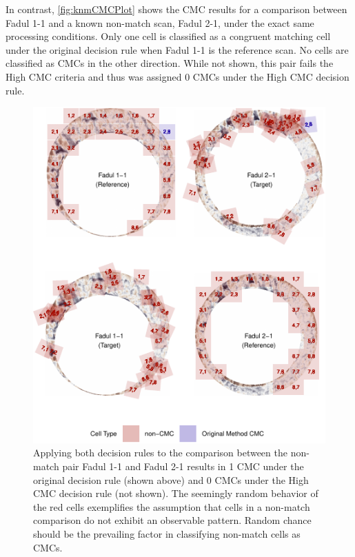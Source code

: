In contrast, \autoref{fig:knmCMCPlot} shows the CMC results for a
comparison between Fadul 1-1 and a known non-match scan, Fadul 2-1,
under the exact same processing conditions. Only one cell is classified
as a congruent matching cell under the original decision rule when Fadul
1-1 is the reference scan. No cells are classified as CMCs in the other
direction. While not shown, this pair fails the High CMC criteria and
thus was assigned 0 CMCs under the High CMC decision rule.

\begin{Schunk}
\begin{figure}[htbp]

{\centering \includegraphics[width=\textwidth]{figures/knmOriginalMethod} 

}

\caption{\label{fig:knmCMCPlot} Applying both decision rules to the comparison between the non-match pair Fadul 1-1 and Fadul 2-1 results in 1 CMC under the original decision rule (shown above) and 0 CMCs under the High CMC decision rule (not shown). The seemingly random behavior of the red cells exemplifies the assumption that cells in a non-match comparison do not exhibit an observable pattern. Random chance should be the prevailing factor in classifying non-match cells as CMCs.}\label{fig:unnamed-chunk-18}
\end{figure}
\end{Schunk}

